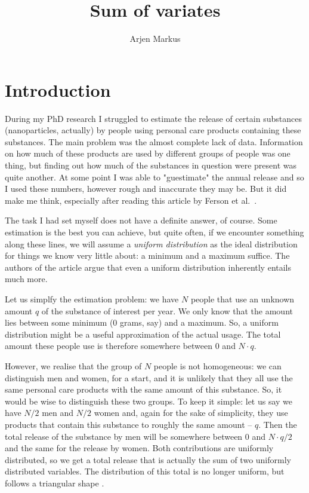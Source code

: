 \documentclass[onecolumn]{article}
\begin{document}
\title{Sum of variates}

\author{Arjen Markus}

\maketitle

\section*{Introduction}
During my PhD research I struggled to estimate the release of certain
substances (nanoparticles, actually) by people using personal care products
containing these substances. The main problem was the almost complete lack of data.
Information on how much of these products are used by different groups of people
was one thing, but finding out how much of the substances in question were present
was quite another. At some point I was able to "guestimate" the annual release
and so I used these numbers, however rough and inaccurate they may be. But it
did make me think, especially after reading this article by Ferson et al.\ \cite{UnknownDistributions}.

The task I had set myself does not have a definite answer, of course. Some estimation
is the best you can achieve, but quite often, if we encounter something along these
lines, we will assume a \emph{uniform distribution} as the ideal distribution for things
we know very little about: a minimum and a maximum suffice. The authors of the article
argue that even a uniform distribution inherently entails much more.

Let us simplfy the estimation problem: we have $N$ people that use an unknown amount $q$
of the substance of interest per year. We only know that the amount lies between some
minimum (0 grams, say) and a maximum. So, a uniform distribution might be a useful
approximation of the actual usage. The total amount these people use is therefore somewhere
between $0$ and $N\cdot q$.

However, we realise that the group of $N$ people is not homogeneous: we can distinguish
men and women, for a start, and it is unlikely that they all use the same personal care
products with the same amount of this substance. So, it would be wise to distinguish these
two groups. To keep it simple: let us say we have $N/2$ men and $N/2$ women and, again
for the sake of simplicity, they use products that contain this substance to roughly the
same amount -- $q$. Then the total release of the substance by men will be somewhere
between $0$ and $N \cdot q/2$ and the same for the release by women. Both contributions
are uniformly distributed, so we get a total release that is actually the sum
of two uniformly distributed variables. The distribution of this total is no longer
uniform, but follows a triangular shape \cite{UniformSumDistribution}.
\end{document}
